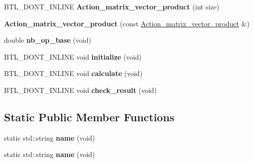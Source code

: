 \begin{DoxyCompactItemize}
\item 
\mbox{\label{class_action__matrix__vector__product_af9d672e301603bf4115830d62cb08599}} 
B\+T\+L\+\_\+\+D\+O\+N\+T\+\_\+\+I\+N\+L\+I\+NE {\bfseries Action\+\_\+matrix\+\_\+vector\+\_\+product} (int size)
\item 
\mbox{\label{class_action__matrix__vector__product_af9cd6ed610de887f591ca52d081e5571}} 
{\bfseries Action\+\_\+matrix\+\_\+vector\+\_\+product} (const \hyperlink{class_action__matrix__vector__product}{Action\+\_\+matrix\+\_\+vector\+\_\+product} \&)
\item 
\mbox{\label{class_action__matrix__vector__product_a53c3279dd4a5be43f1bee18f015dd962}} 
double {\bfseries nb\+\_\+op\+\_\+base} (void)
\item 
\mbox{\label{class_action__matrix__vector__product_aad3d4a1a36d274973c3e30c83c38c914}} 
B\+T\+L\+\_\+\+D\+O\+N\+T\+\_\+\+I\+N\+L\+I\+NE void {\bfseries initialize} (void)
\item 
\mbox{\label{class_action__matrix__vector__product_a4a0ab0613498abd6231f47ce14f87ff9}} 
B\+T\+L\+\_\+\+D\+O\+N\+T\+\_\+\+I\+N\+L\+I\+NE void {\bfseries calculate} (void)
\item 
\mbox{\label{class_action__matrix__vector__product_a7679cb2041b51eb79e6ad813af161a3b}} 
B\+T\+L\+\_\+\+D\+O\+N\+T\+\_\+\+I\+N\+L\+I\+NE void {\bfseries check\+\_\+result} (void)
\end{DoxyCompactItemize}
\subsection*{Static Public Member Functions}
\begin{DoxyCompactItemize}
\item 
\mbox{\label{class_action__matrix__vector__product_ae94224ff48ad9a5b86c797ed7d36963a}} 
static std\+::string {\bfseries name} (void)
\item 
\mbox{\label{class_action__matrix__vector__product_ae94224ff48ad9a5b86c797ed7d36963a}} 
static std\+::string {\bfseries name} (void)
\end{DoxyCompactItemize}


